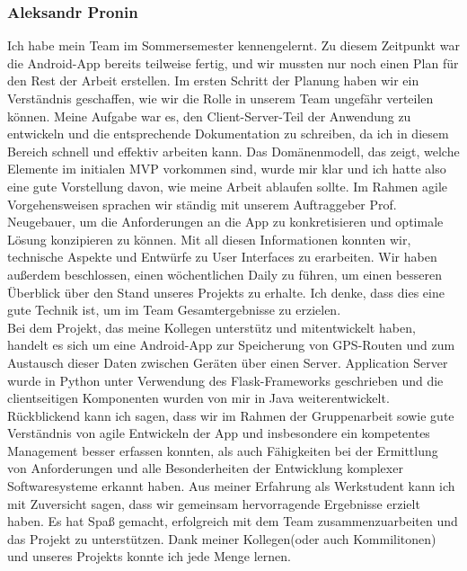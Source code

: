 \documentclass[10pt]{article}
\begin{document}
\subsubsection{Aleksandr Pronin}
    Ich habe mein Team im Sommersemester kennengelernt. Zu diesem Zeitpunkt war die Android-App bereits teilweise fertig, 
    und wir mussten nur noch einen Plan für den Rest der Arbeit erstellen.
    Im ersten Schritt der Planung haben wir ein Verständnis geschaffen, wie wir die Rolle in unserem Team ungefähr verteilen können. 
    Meine Aufgabe war es, den Client-Server-Teil der Anwendung zu entwickeln und die entsprechende Dokumentation zu schreiben,
    da ich in diesem Bereich schnell und effektiv arbeiten kann.
    Das Domänenmodell, das zeigt, welche Elemente im initialen MVP vorkommen sind, wurde mir klar und ich hatte also eine gute Vorstellung
    davon, wie meine Arbeit ablaufen sollte.  Im Rahmen agile Vorgehensweisen sprachen wir ständig mit unserem Auftraggeber Prof. Neugebauer, 
    um die Anforderungen an die App zu konkretisieren und optimale Lösung konzipieren zu können. Mit all diesen Informationen konnten wir,
    technische Aspekte und Entwürfe zu User Interfaces zu erarbeiten. Wir haben außerdem beschlossen, einen wöchentlichen Daily zu führen, 
    um einen besseren Überblick über den Stand unseres Projekts zu erhalte. Ich denke, dass dies eine gute Technik ist, um im Team Gesamtergebnisse 
    zu erzielen. \\
    Bei dem Projekt, das meine Kollegen unterstütz und mitentwickelt haben, handelt es sich um eine Android-App zur 
    Speicherung von GPS-Routen und zum Austausch dieser Daten zwischen Geräten über einen Server. Application Server wurde
    in Python unter Verwendung des Flask-Frameworks geschrieben und die clientseitigen Komponenten wurden von mir 
    in Java weiterentwickelt. Rückblickend kann ich sagen, dass wir im Rahmen der Gruppenarbeit sowie  gute Verständnis von agile 
    Entwickeln der App und insbesondere ein kompetentes Management besser erfassen konnten, als auch Fähigkeiten bei der Ermittlung von Anforderungen 
    und alle Besonderheiten der Entwicklung komplexer Softwaresysteme erkannt haben. Aus meiner Erfahrung als Werkstudent kann ich mit Zuversicht sagen,
    dass wir gemeinsam hervorragende Ergebnisse erzielt haben. Es hat Spaß gemacht, erfolgreich mit dem Team zusammenzuarbeiten und das Projekt zu 
    unterstützen. Dank meiner Kollegen(oder auch Kommilitonen) und unseres Projekts konnte ich jede Menge lernen.
\end{document}
